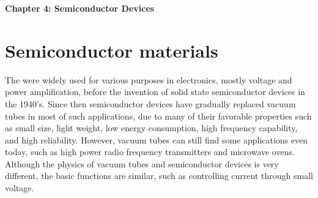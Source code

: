 \usepackage{html}


{\bf Chapter 4: Semiconductor Devices}

\section*{Semiconductor materials}

The  were widely used for various purposes in electronics, mostly voltage 
and power amplification, before the invention of solid state semiconductor 
devices in the 1940's. Since then semiconductor devices have gradually replaced
vacuum tubes in most of such applications, due to many of their favorable 
properties such as small size, light weight, low energy consumption, high 
frequency capability, and high reliability. However, vacuum tubes can still 
find some applications even today, such as high power radio frequency transmitters
and microwave ovens. Although the physics of vacuum tubes and semiconductor 
devices is very different, the basic functions are similar, such as controlling
current through small voltage.


